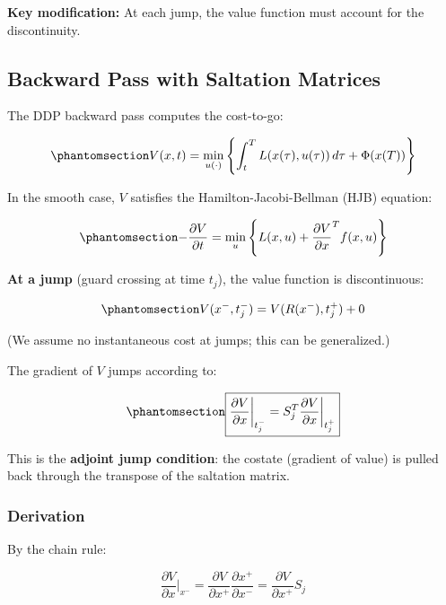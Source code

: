 \documentclass[
  letterpaper,
  DIV=11,
  numbers=noendperiod]{scrartcl}
\begin{document}
\textbf{Key modification:} At each jump, the value function must account
for the discontinuity.

\subsection{Backward Pass with Saltation
Matrices}\label{backward-pass-with-saltation-matrices}

The DDP backward pass computes the cost-to-go:

\begin{equation}\phantomsection\label{eq-value-function}{
V(x, t) = \min_{u(\cdot)} \left\{ \int_t^T L(x(\tau), u(\tau)) \, d\tau + \Phi(x(T)) \right\}
}\end{equation}

In the smooth case, \(V\) satisfies the Hamilton-Jacobi-Bellman (HJB)
equation:

\begin{equation}\phantomsection\label{eq-hjb}{
-\frac{\partial V}{\partial t} = \min_u \left\{ L(x, u) + \frac{\partial V}{\partial x}^T f(x, u) \right\}
}\end{equation}

\textbf{At a jump} (guard crossing at time \(t_j\)), the value function
is discontinuous:

\begin{equation}\phantomsection\label{eq-value-jump}{
V(x^-, t_j^-) = V(R(x^-), t_j^+) + 0
}\end{equation}

(We assume no instantaneous cost at jumps; this can be generalized.)

The gradient of \(V\) jumps according to:

\begin{equation}\phantomsection\label{eq-value-gradient-jump}{
\boxed{\frac{\partial V}{\partial x}\bigg|_{t_j^-} = S_j^T \frac{\partial V}{\partial x}\bigg|_{t_j^+}}
}\end{equation}

This is the \textbf{adjoint jump condition}: the costate (gradient of
value) is pulled back through the transpose of the saltation matrix.

\subsubsection{Derivation}\label{derivation}

By the chain rule:

\[
\frac{\partial V}{\partial x}\bigg|_{x^-} = \frac{\partial V}{\partial x^+} \frac{\partial x^+}{\partial x^-} = \frac{\partial V}{\partial x^+} S_j
\]
\end{document}

